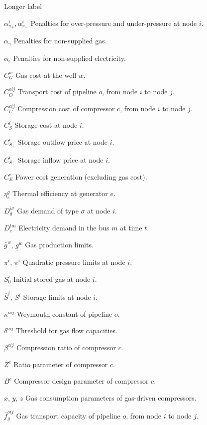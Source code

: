 \begin{labeling}{Longer label\quad}
\item [$\alpha^{i}_{\pi_+}, \alpha^{i}_{\pi _-}$] Penalties for over-pressure and under-pressure at node $i$.
\item [$\alpha_{\gamma}$] Penalties for non-supplied gas.
\item [$\alpha_{\epsilon}$] Penalties for non-supplied electricity.
\item [$C^{w}_{G}$] Gas cost at the well $w$.
\item [$C^{oij}_{O}$] Transport cost of pipeline $o$, from node $i$ to node $j$.
\item [$C^{cij}_{C}$] Compression cost of compressor $c$, from node $i$ to node $j$.
\item [$C^{i}_{S}$] Storage cost at node $i$.
\item [$C^{i}_{S_+}$] Storage outflow price at node $i$.
\item [$C^{i}_{S_-}$] Storage inflow price at node $i$.
\item [$C^{e}_{E}$] Power cost generation (excluding gas cost).
\item [$\eta^{q}_{e}$] Thermal efficiency at generator $e$.
\item [$D_{g}^{i \sigma}$] Gas demand of type $\sigma$ at node $i$.
\item [$D_{e}^{tm}$] Electricity demand in the bus $m$ at time $t$.
\item [$\bar{g}^{w}$, $\underline{g}^{w}$] Gas production limits.
\item [$\overline{\pi}^{i}$, $\underline{\pi}^{i}$] Quadratic pressure limits at node $i$.
\item [$S^{i}_{0}$] Initial stored gas at node $i$.
\item [$\overline{S}^{i}$, $\underline{S}^{i}$] Storage limits at node $i$.
\item [$\kappa^{oij}$] Weymouth constant of pipeline $o$.
\item [$\delta^{oij}$] Threshold for gas flow capacities.
\item [$\beta^{cij}$] Compression ratio of compressor $c$.
\item [$Z^{c}$] Ratio parameter of compressor $c$.
\item [$B^{c}$] Compressor design parameter of compressor $c$.
\item [$x$, $y$, $z$] Gas consumption parameters of gas-driven compressors.
\item [$\overline{f}^{oij}_{g}$] Gas transport capacity of pipeline $o$, from node $i$ to node $j$.

\end{labeling}
